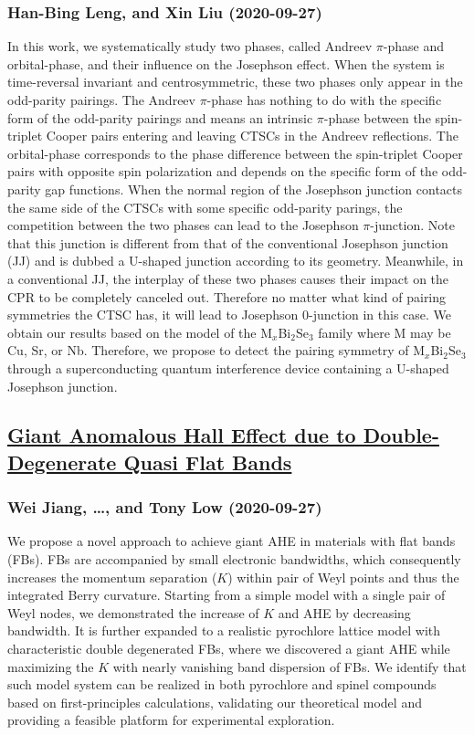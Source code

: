 \subsubsection*{Han-Bing Leng, and Xin Liu (2020-09-27)}
In this work, we systematically study two phases, called Andreev $\pi$-phase
and orbital-phase, and their influence on the Josephson effect. When the system
is time-reversal invariant and centrosymmetric, these two phases only appear in
the odd-parity pairings. The Andreev $\pi$-phase has nothing to do with the
specific form of the odd-parity pairings and means an intrinsic $\pi$-phase
between the spin-triplet Cooper pairs entering and leaving CTSCs in the Andreev
reflections. The orbital-phase corresponds to the phase difference between the
spin-triplet Cooper pairs with opposite spin polarization and depends on the
specific form of the odd-parity gap functions. When the normal region of the
Josephson junction contacts the same side of the CTSCs with some specific
odd-parity parings, the competition between the two phases can lead to the
Josephson $\pi$-junction. Note that this junction is different from that of the
conventional Josephson junction (JJ) and is dubbed a U-shaped junction
according to its geometry. Meanwhile, in a conventional JJ, the interplay of
these two phases causes their impact on the CPR to be completely canceled out.
Therefore no matter what kind of pairing symmetries the CTSC has, it will lead
to Josephson 0-junction in this case. We obtain our results based on the model
of the M$_{x}$Bi$_2$Se$_3$ family where M may be Cu, Sr, or Nb. Therefore, we
propose to detect the pairing symmetry of M$_{x}$Bi$_2$Se$_3$ through a
superconducting quantum interference device containing a U-shaped Josephson
junction.

\subsection*{\href{http://arxiv.org/abs/2009.12890v1}{Giant Anomalous Hall Effect due to Double-Degenerate Quasi Flat Bands}}
\subsubsection*{Wei Jiang, \dots, and Tony Low (2020-09-27)}
We propose a novel approach to achieve giant AHE in materials with flat bands
(FBs). FBs are accompanied by small electronic bandwidths, which consequently
increases the momentum separation ($K$) within pair of Weyl points and thus the
integrated Berry curvature. Starting from a simple model with a single pair of
Weyl nodes, we demonstrated the increase of $K$ and AHE by decreasing
bandwidth. It is further expanded to a realistic pyrochlore lattice model with
characteristic double degenerated FBs, where we discovered a giant AHE while
maximizing the $K$ with nearly vanishing band dispersion of FBs. We identify
that such model system can be realized in both pyrochlore and spinel compounds
based on first-principles calculations, validating our theoretical model and
providing a feasible platform for experimental exploration.

